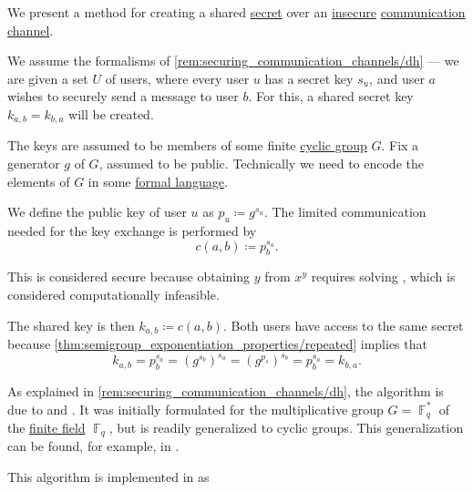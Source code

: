 \begin{algorithm}\label{alg:diffie_hellman_key_exchange}
  We present a method for creating a shared \hyperref[con:privacy]{secret} over an \hyperref[con:privacy]{insecure} \hyperref[con:communication_channel]{communication channel}.

  We assume the formalisms of \cref{rem:securing_communication_channels/dh} --- we are given a set \( U \) of users, where every user \( u \) has a secret key \( s_u \), and user \( a \) wishes to securely send a message to user \( b \). For this, a shared secret key \( k_{a,b} = k_{b,a} \) will be created.

  The keys are assumed to be members of some finite \hyperref[def:cyclic_group]{cyclic group} \( G \). Fix a generator \( g \) of \( G \), assumed to be public. Technically we need to encode the elements of \( G \) in some \hyperref[def:formal_language]{formal language}.

  We define the public key of user \( u \) as \( p_u \coloneqq g^{s_u} \). The limited communication needed for the key exchange is performed by
  \begin{equation*}
    c(a, b) \coloneqq p_b^{s_a}.
  \end{equation*}

  This is considered secure because obtaining \( y \) from \( x^y \) requires solving , which is considered computationally infeasible.

  The shared key is then \( k_{a,b} \coloneqq c(a, b) \). Both users have access to the same secret because \cref{thm:semigroup_exponentiation_properties/repeated} implies that
  \begin{equation*}
    k_{a,b} = p_b^{s_a} = (g^{s_b})^{s_a} = (g^{p_s})^{s_b} = p_b^{s_a} = k_{b,a}.
  \end{equation*}
\end{algorithm}
\begin{comments}
  \item As explained in \cref{rem:securing_communication_channels/dh}, the algorithm is due to \textcite{Merkle1978SecureCommunications} and \textcite{DiffieHellman1976NewDirectionsInCryptography}. It was initially formulated for the multiplicative group \( G = \BbbF_q^* \) of the \hyperref[def:finite_field]{finite field} \( \BbbF_q \), but is readily generalized to cyclic groups. This generalization can be found, for example, in \cite[99]{Koblitz1994NumberTheoryAndCryptography}.

  \item This algorithm is implemented in \cite{notebook:code} as
  \begin{CodeRefDisplay}
  \end{CodeRefDisplay}
\end{comments}

